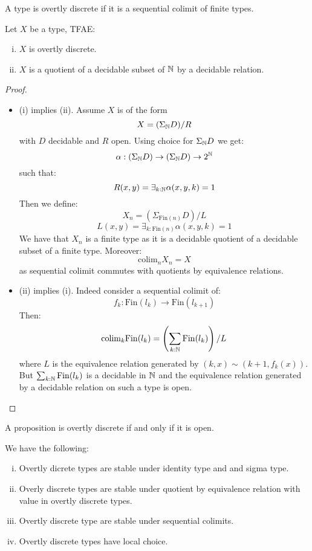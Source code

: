 \begin{definition}
A type is overtly discrete if it is a sequential colimit of finite types.
\end{definition}

\begin{lemma}\label{overtly-discrete-colimit-finite}
Let $X$ be a type, TFAE:
\begin{enumerate}[(i)]
\item $X$ is overtly discrete.
\item $X$ is a quotient of a decidable subset of $\mathbb{N}$ by a decidable relation.
\end{enumerate}
\end{lemma}

\begin{proof}
\begin{itemize}
\item (i) implies (ii). Assume $X$ is of the form
\[X  = (\Sigma_{\mathbb{N}} D)/R\]
with $D$ decidable and $R$ open. Using choice for $\Sigma_{\mathbb{N}} D$ we get:
\[\alpha : (\Sigma_{\mathbb{N}} D) \to (\Sigma_{\mathbb{N}} D)\to 2^{\mathbb{N}}\]
such that:
\[R(x,y) = \exists_{k:\mathbb{N}} \alpha(x,y,k) = 1\]
Then we define:
\[X_n = (\Sigma_{\mathrm{Fin}(n)} D) / L\]
\[L(x,y) = \exists_{k:\mathrm{Fin}(n)} \alpha(x,y,k) = 1\]
We have that $X_n$ is a finite type as it is a decidable quotient of a decidable subset of a finite type. Moreover:
\[\mathrm{colim}_n X_n = X\]
as sequential colimit commutes with quotients by equivalence relations.
\item (ii) implies (i). Indeed consider a sequential colimit of:
\[f_k : \mathrm{Fin}(l_k) \to \mathrm{Fin}(l_{k+1})\]
Then:
\[\mathrm{colim}_k \mathrm{Fin}(l_k)  =  \left(\sum_{k:\mathbb{N}} \mathrm{Fin}(l_k)\right) / L\]
where $L$ is the equivalence relation generated by $(k,x) \sim (k+1,f_k(x))$. But $\sum_{k:\mathbb{N}} \mathrm{Fin}(l_k)$ is a decidable in $\mathbb{N}$ and the equivalence relation generated by a decidable relation on such a type is open.
\end{itemize}
\end{proof}

\begin{remark}
A proposition is overtly discrete if and only if it is open.
\end{remark}

\begin{theorem}
We have the following:
\begin{enumerate}[(i)]
\item Overtly dicrete types are stable under identity type and and sigma type.
\item Overly discrete types are stable under quotient by equivalence relation with value in overtly discrete types.
\item Overtly discrete type are stable under sequential colimits.
\item Overtly discrete types have local choice.
\end{enumerate}
\end{theorem}

